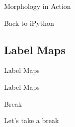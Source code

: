\begin{frame}{Morphology in Action}
\center
\begin{center}
Back to iPython
\end{center}
\end{frame}


\subsection{Label Maps}

\begin{frame}{Label Maps}
\fontsize{36pt}{36pt}\selectfont
\center
\begin{center}
Label Maps
\end{center}
\end{frame}

\begin{frame}{Break}
\fontsize{36pt}{36pt}\selectfont
\center
\begin{center}
Let's take a break
\end{center}
\end{frame}

